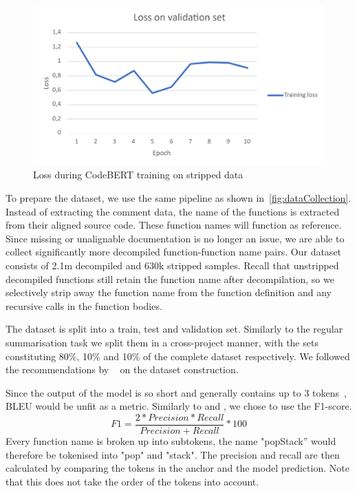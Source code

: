 \begin{figure}[h]
  \centering
  \includegraphics[width=\linewidth]{img/ExtremeLoss.png}
  \caption{Loss during CodeBERT training on stripped data}
  \label{fig:ExtremeLoss}
\end{figure}

To prepare the dataset, we use the same pipeline as shown in~\ref{fig:dataCollection}. Instead of extracting the comment data, the name of the functions is extracted from their aligned source code. These function names will function as reference. Since missing or unalignable documentation is no longer an issue, we are able to collect significantly more decompiled function-function name pairs. Our dataset consists of 2.1m decompiled and 630k stripped samples. Recall that unstripped decompiled functions still retain the function name after decompilation, so we selectively strip away the function name from the function definition and any recursive calls in the function bodies. 

The dataset is split into a train, test and validation set. Similarly to the regular summarisation task we split them in a cross-project manner, with the sets constituting 80\%, 10\% and 10\% of the complete dataset respectively. We followed the recommendations by ~\citeauthor{recommend_summarization} on the dataset construction. 

Since the output of the model is so short and generally contains up to 3 tokens~\cite{ExtremeSummarization}, BLEU would be unfit as a metric. Similarly to \citeauthor{ExtremeSummarization} and \citeauthor{PolyglotCodeBERT}, we chose to use the F1-score.
\[\mathit{F1} = \frac{2*\mathit{Precision}*\mathit{Recall}}{\mathit{Precision}+\mathit{Recall}} * 100\] 
Every function name is broken up into subtokens, the name "popStack'' would therefore be tokenised into "pop" and "stack". The precision and recall are then calculated by comparing the tokens in the anchor and the model prediction. Note that this does not take the order of the tokens into account.

